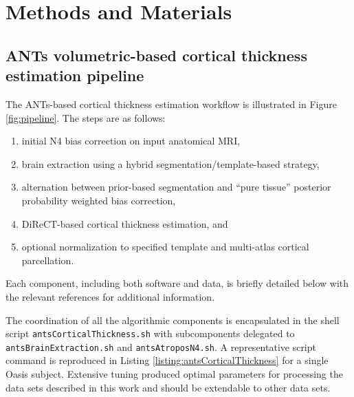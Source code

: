 \section{Methods and Materials}

\subsection{ANTs volumetric-based cortical thickness estimation pipeline}

The ANTs-based cortical thickness estimation workflow is illustrated 
in Figure \ref{fig:pipeline}.  The steps are as follows:
\begin{enumerate}
  \item initial N4 bias correction on input anatomical MRI,
  \item brain extraction using a hybrid segmentation/template-based strategy,
  \item alternation between prior-based segmentation and ``pure tissue'' 
        posterior probability weighted bias correction,
  \item DiReCT-based cortical thickness estimation, and
  \item optional normalization to specified template and multi-atlas
    cortical parcellation. 
\end{enumerate}
Each component, including both software and data, is briefly detailed 
below with the relevant references for additional information. 

The coordination of all the algorithmic components is
encapsulated in the shell script \verb#antsCorticalThickness.sh# with
subcomponents delegated to \verb#antsBrainExtraction.sh# 
and \verb#antsAtroposN4.sh#.  A representative script command 
is reproduced in Listing \ref{listing:antsCorticalThickness} for
a single Oasis subject.
Extensive tuning produced
optimal parameters for processing the data sets
described in this work and should be extendable to 
other data sets.

